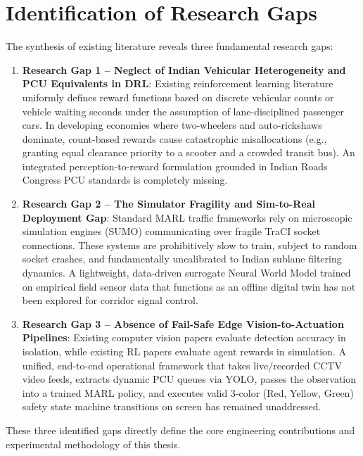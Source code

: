 \documentclass[12pt,a4paper,oneside]{report}
\begin{document}
\section{Identification of Research Gaps}
\label{sec:research_gaps}
The synthesis of existing literature reveals three fundamental research gaps:
\begin{enumerate}
    \item \textbf{Research Gap 1 -- Neglect of Indian Vehicular Heterogeneity and PCU Equivalents in DRL}: Existing reinforcement learning literature uniformly defines reward functions based on discrete vehicular counts or vehicle waiting seconds under the assumption of lane-disciplined passenger cars. In developing economies where two-wheelers and auto-rickshaws dominate, count-based rewards cause catastrophic misallocations (e.g., granting equal clearance priority to a scooter and a crowded transit bus). An integrated perception-to-reward formulation grounded in Indian Roads Congress PCU standards is completely missing.
    \item \textbf{Research Gap 2 -- The Simulator Fragility and Sim-to-Real Deployment Gap}: Standard MARL traffic frameworks rely on microscopic simulation engines (SUMO) communicating over fragile TraCI socket connections. These systems are prohibitively slow to train, subject to random socket crashes, and fundamentally uncalibrated to Indian sublane filtering dynamics. A lightweight, data-driven surrogate Neural World Model trained on empirical field sensor data that functions as an offline digital twin has not been explored for corridor signal control.
    \item \textbf{Research Gap 3 -- Absence of Fail-Safe Edge Vision-to-Actuation Pipelines}: Existing computer vision papers evaluate detection accuracy in isolation, while existing RL papers evaluate agent rewards in simulation. A unified, end-to-end operational framework that takes live/recorded CCTV video feeds, extracts dynamic PCU queues via YOLO, passes the observation into a trained MARL policy, and executes valid 3-color (Red, Yellow, Green) safety state machine transitions on screen has remained unaddressed.
\end{enumerate}

These three identified gaps directly define the core engineering contributions and experimental methodology of this thesis.

\end{document}
